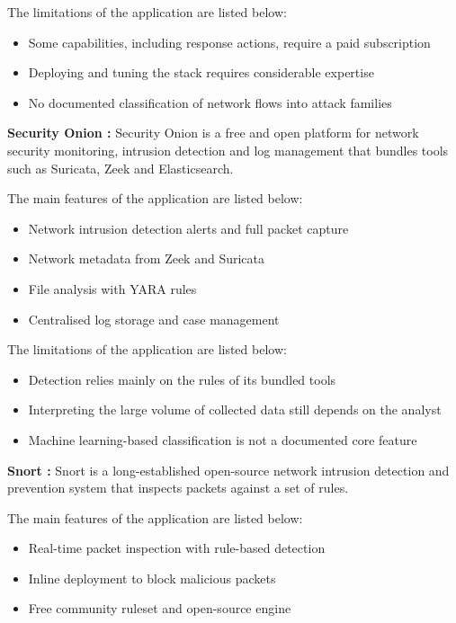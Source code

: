 The limitations of the application are listed below:
\begin{itemize}
    \setlength{\itemsep}{1pt}
    \setlength{\parskip}{0pt}
    \setlength{\parsep}{0pt}
    \item Some capabilities, including response actions, require a paid subscription
    \item Deploying and tuning the stack requires considerable expertise
    \item No documented classification of network flows into attack families
\end{itemize}

\vspace{6pt}
\textbf{Security Onion \cite{securityonion}:} Security Onion is a free and open platform for network security monitoring, intrusion detection and log management that bundles tools such as Suricata, Zeek and Elasticsearch.

The main features of the application are listed below:
\begin{itemize}
    \setlength{\itemsep}{1pt}
    \setlength{\parskip}{0pt}
    \setlength{\parsep}{0pt}
    \item Network intrusion detection alerts and full packet capture
    \item Network metadata from Zeek and Suricata
    \item File analysis with YARA rules
    \item Centralised log storage and case management
\end{itemize}

The limitations of the application are listed below:
\begin{itemize}
    \setlength{\itemsep}{1pt}
    \setlength{\parskip}{0pt}
    \setlength{\parsep}{0pt}
    \item Detection relies mainly on the rules of its bundled tools
    \item Interpreting the large volume of collected data still depends on the analyst
    \item Machine learning-based classification is not a documented core feature
\end{itemize}

\vspace{6pt}
\textbf{Snort \cite{roesch1999snort}:} Snort is a long-established open-source network intrusion detection and prevention system that inspects packets against a set of rules.

The main features of the application are listed below:
\begin{itemize}
    \setlength{\itemsep}{1pt}
    \setlength{\parskip}{0pt}
    \setlength{\parsep}{0pt}
    \item Real-time packet inspection with rule-based detection
    \item Inline deployment to block malicious packets
    \item Free community ruleset and open-source engine
\end{itemize}

